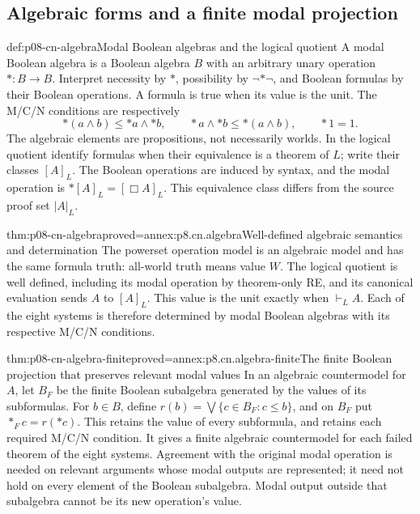 \subsection{Algebraic forms and a finite modal projection}
\label{sec:p08-cn-algebra}

\begin{hbdefinition}{def:p08-cn-algebra}{Modal Boolean algebras and the logical quotient}
A modal Boolean algebra is a Boolean algebra \(B\) with an
arbitrary unary operation \(\ast:B\to B\).
Interpret necessity by \(\ast\), possibility by \(\neg\ast\neg\),
and Boolean formulas by their Boolean operations. A formula is true
when its value is the unit. The M/C/N conditions are respectively
\[
 \ast(a\land b)\leq\ast a\land\ast b,\qquad
 \ast a\land\ast b\leq\ast(a\land b),\qquad \ast1=1.
\]
The algebraic elements are propositions, not necessarily worlds.
In the logical quotient identify formulas when their equivalence
is a theorem of \(L\); write their classes \([A]_L\).
The Boolean operations are induced by syntax, and the modal operation
is \(\ast[A]_L=[\Box A]_L\). This equivalence class differs
from the source proof set \(|A|_L\).
\end{hbdefinition}

\begin{hbtheorem}{thm:p08-cn-algebra}{proved=annex:p8.cn.algebra}{Well-defined algebraic semantics and determination}
The powerset operation model is an algebraic model and has the
same formula truth: all-world truth means value \(W\).
The logical quotient is well defined, including its modal operation
by theorem-only RE, and its canonical evaluation sends \(A\)
to \([A]_L\). This value is the unit exactly when \(\vdash_L A\).
Each of the eight systems is therefore determined by modal Boolean
algebras with its respective M/C/N conditions.
\end{hbtheorem}

\begin{hbtheorem}{thm:p08-cn-algebra-finite}{proved=annex:p8.cn.algebra-finite}{The finite Boolean projection that preserves relevant modal values}
In an algebraic countermodel for \(A\), let \(B_F\) be the
finite Boolean subalgebra generated by the values of its subformulas.
For \(b\in B\), define
\(r(b)=\bigvee\{c\in B_F:c\leq b\}\), and on \(B_F\) put
\(\ast_Fc=r(\ast c)\). This retains the value of every subformula,
and retains each required M/C/N condition. It gives a finite
algebraic countermodel for each failed theorem of the eight systems.
Agreement with the original modal operation is needed on relevant
arguments whose modal outputs are represented; it need not hold on
every element of the Boolean subalgebra. Modal output outside that
subalgebra cannot be its new operation's value.
\end{hbtheorem}

